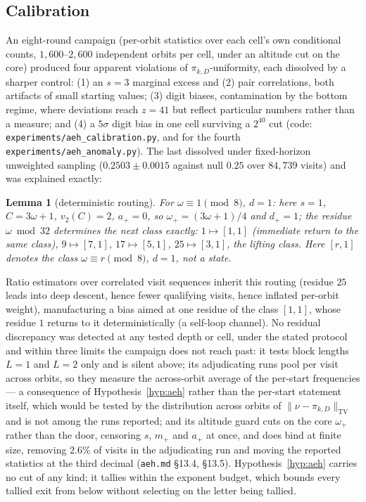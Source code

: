 \documentclass[11pt]{article}
\newtheorem{lemma}[theorem]{Lemma}
\theoremstyle{remark}
\newcommand{\vt}[1]{v_2\!\left(#1\right)}
\newcommand{\w}{\omega}
\newcommand{\wnext}{\w_{+}}
\newcommand{\dnext}{d_{+}}
\begin{document}
\subsection*{Calibration}

An eight-round campaign (per-orbit statistics over each cell's own conditional counts, $1{,}600$--$2{,}600$ independent orbits per cell, under an altitude cut on the core) produced four apparent violations of $\pi_{k,D}$-uniformity, each dissolved by a sharper control: (1) an $s{=}3$ marginal excess and (2) pair correlations, both artifacts of small starting values; (3) digit biases, contamination by the bottom regime, where deviations reach $z=41$ but reflect particular numbers rather than a measure; and (4) a $5\sigma$ digit bias in one cell surviving a $2^{40}$ cut (code: \texttt{experiments/aeh\_calibration.py}, and for the fourth \texttt{experiments/aeh\_anomaly.py}). The last dissolved under fixed-horizon unweighted sampling ($0.2503\pm0.0015$ against null $0.25$ over $84{,}739$ visits) and was explained exactly:

\begin{lemma}[deterministic routing]\label{lem:routing}
For $\w \equiv 1 \pmod 8$, $d = 1$: here $s = 1$, $C = 3\w + 1$, $\vt{C} = 2$, $a_+ = 0$, so $\wnext = (3\w+1)/4$ and $\dnext = 1$; the residue $\w \bmod 32$ determines the next class exactly: $1 \mapsto [1,1]$ (immediate return to the same class), $9 \mapsto [7,1]$, $17 \mapsto [5,1]$, $25 \mapsto [3,1]$, the lifting class. Here $[r,1]$ denotes the class $\w \equiv r \pmod 8$, $d = 1$, not a state.
\end{lemma}

Ratio estimators over correlated visit sequences inherit this routing (residue $25$ leads into deep descent, hence fewer qualifying visits, hence inflated per-orbit weight), manufacturing a bias aimed at one residue of the class $[1,1]$, whose residue $1$ returns to it deterministically (a self-loop channel). No residual discrepancy was detected at any tested depth or cell, under the stated protocol and within three limits the campaign does not reach past: it tests block lengths $L = 1$ and $L = 2$ only and is silent above; its adjudicating runs pool per visit across orbits, so they measure the across-orbit average of the per-start frequencies --- a consequence of Hypothesis~\ref{hyp:aeh} rather than the per-start statement itself, which would be tested by the distribution across orbits of $\lVert\nu - \pi_{k,D}\rVert_{\mathrm{TV}}$ and is not among the runs reported; and its altitude guard cuts on the core $\wnext$ rather than the door, censoring $s$, $m_+$ and $a_+$ at once, and does bind at finite size, removing $2.6\%$ of visits in the adjudicating run and moving the reported statistics at the third decimal (\texttt{aeh.md} \S13.4, \S13.5). Hypothesis~\ref{hyp:aeh} carries no cut of any kind; it tallies within the exponent budget, which bounds every tallied exit from below without selecting on the letter being tallied.
\end{document}
